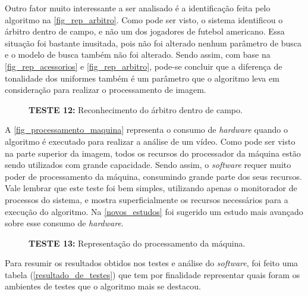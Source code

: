 Outro fator muito interessante a ser analisado é a identificação feita pelo algoritmo na \autoref{fig_rep_arbitro}. Como pode ser visto, o sistema identificou o árbitro dentro de campo, e não  um dos jogadores de futebol americano. Essa situação foi bastante inusitada, pois não foi alterado nenhum parâmetro de busca e o modelo de busca também não foi alterado. Sendo assim, com base na \autoref{fig_rep_acessorios} e \autoref{fig_rep_arbitro}, pode-se concluir que a diferença de tonalidade dos uniformes também é um parâmetro que o algoritmo leva em consideração para realizar o processamento de imagem.

\clearpage

\begin{figure}[ht]
	\caption{\label{fig_rep_arbitro}\textbf{TESTE 12:} Reconhecimento do árbitro dentro de campo.}
	\begin{center}
	\end{center}
	\centering {}
\end{figure}

A \autoref{fig_processamento_maquina}  representa o consumo de \textit{hardware} quando o algoritmo é executado para realizar a análise de um vídeo. Como pode ser visto na parte superior da imagem, todos os recursos do processador da máquina estão sendo utilizados com grande capacidade. Sendo assim, o \textit{software} requer muito poder de processamento da máquina, consumindo grande parte dos seus recursos.  Vale lembrar que este teste foi bem simples, utilizando apenas o monitorador de processos do sistema, e mostra superficialmente os recursos necessários para a execução do algoritmo. Na \autoref{novos_estudos} foi sugerido um estudo mais avançado sobre esse consumo de \textit{hardware}.

\begin{figure}[ht]
	\caption{\label{fig_processamento_maquina}\textbf{TESTE 13:} Representação do processamento da máquina.}
	\begin{center}
	\end{center}
	\centering {}
\end{figure}

Para resumir os resultados obtidos nos testes e análise do \textit{software}, foi feito uma tabela (\autoref{resultado_de_testes}) que tem por finalidade representar quais foram os ambientes de testes que o algoritmo mais se destacou.

